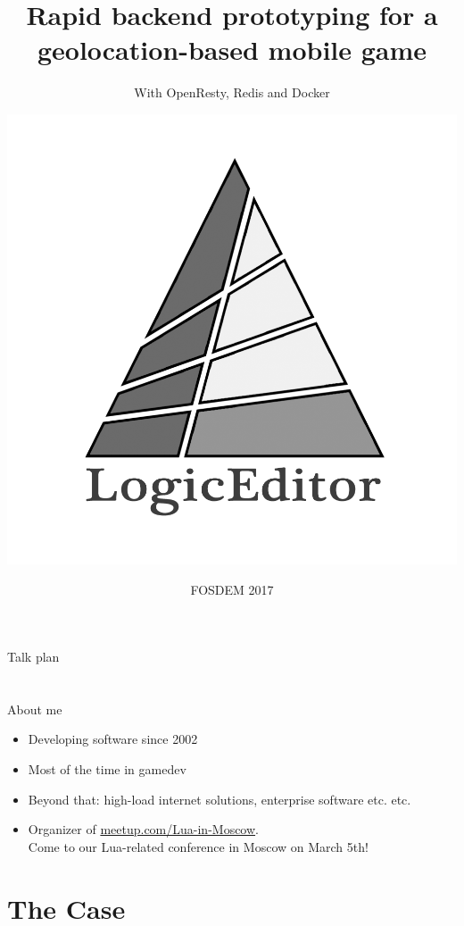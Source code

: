 \documentclass[aspectratio=169,handout,bigger]{beamer}
\title{Rapid backend prototyping for a geolocation-based mobile game}
\subtitle{With OpenResty, Redis and Docker}
\author{\includegraphics[height=.4\textheight]{logo}}
\institute{Alexander Gladysh <ag@logiceditor.com>\newline@agladysh}
\date{FOSDEM 2017}
\begin{document}
\begin{frame}[plain]
 \titlepage
\end{frame}


\begin{frame}{Talk plan}

\tableofcontents

\end{frame}


\section*{}

\begin{frame}{About me}

\begin{itemize}
\item Developing software since 2002
\item Most of the time in gamedev
\item Beyond that: high-load internet solutions, enterprise software etc. etc.
\item Organizer of
      \href{http://meetup.com/Lua-in-Moscow}{meetup.com/Lua-in-Moscow}. \\
      Come to our Lua-related conference in Moscow on March 5th!
\end{itemize}

\end{frame}


\section{The Case}

\end{document}
